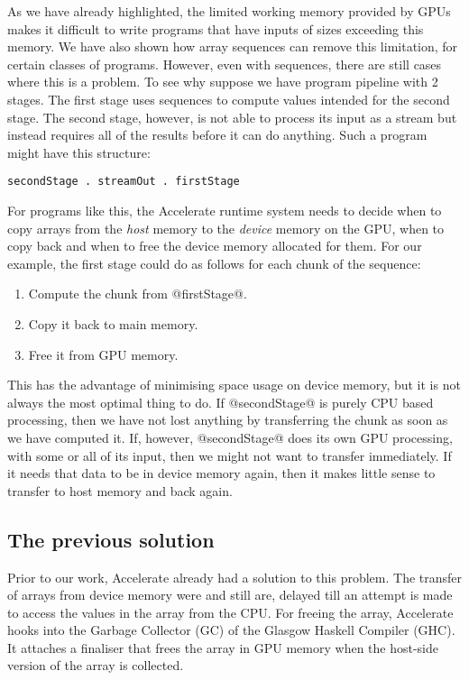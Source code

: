 As we have already highlighted, the limited working memory provided by GPUs makes it difficult to write programs that have inputs of sizes exceeding this memory. We have also shown how array sequences can remove this limitation, for certain classes of programs. However, even with sequences, there are still cases where this is a problem. To see why suppose we have program pipeline with 2 stages. The first stage uses sequences to compute values intended for the second stage. The second stage, however, is not able to process its input as a stream but instead requires all of the results before it can do anything. Such a program might have this structure:
%
\begin{lstlisting}
secondStage . streamOut . firstStage
\end{lstlisting}

For programs like this, the Accelerate runtime system needs to decide when to copy arrays from the \emph{host} memory to the \emph{device} memory on the GPU, when to copy back and when to free the device memory allocated for them. For our example, the first stage could do as follows for each chunk of the sequence:
%
\begin{enumerate}
\item Compute the chunk from @firstStage@.
\item Copy it back to main memory.
\item Free it from GPU memory.
\end{enumerate}
%
This has the advantage of minimising space usage on device memory, but it is not always the most optimal thing to do. If @secondStage@ is purely CPU based processing, then we have not lost anything by transferring the chunk as soon as we have computed it. If, however, @secondStage@ does its own GPU processing, with some or all of its input, then we might not want to transfer immediately. If it needs that data to be in device memory again, then it makes little sense to transfer to host memory and back again.

\subsection{The previous solution}

Prior to our work, Accelerate already had a solution to this problem. The transfer of arrays from device memory were and still are, delayed till an attempt is made to access the values in the array from the CPU. For freeing the array, Accelerate hooks into the Garbage Collector (GC) of the Glasgow Haskell Compiler (GHC). It attaches a finaliser that frees the array in GPU memory when the host-side version of the array is collected.

